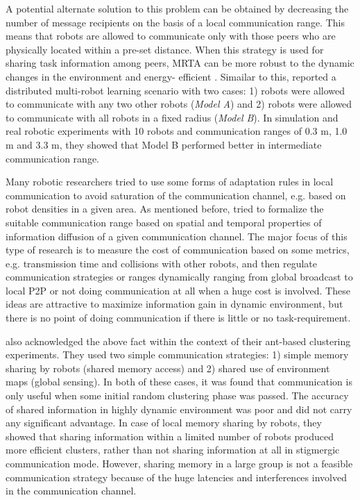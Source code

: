 \documentclass{intech}
\begin{document}
A potential alternate solution to this problem can be obtained by decreasing the number of message recipients on the basis of a local communication range. This means that robots are allowed to communicate only with those peers who are physically located within a pre-set distance. When this strategy is used for sharing task information among peers, MRTA can be more robust to the dynamic changes in the environment and energy- efficient \citep{Agassounon+2002}. Simailar to this, \cite{Pugh+2009} reported a distributed multi-robot learning scenario with two cases: 1) robots were allowed to communicate with any two other robots ({\em Model A}) and 2)  robots were allowed to communicate with all robots in a fixed radius ({\em Model B}). In simulation and real robotic experiments with 10 robots and communication ranges of 0.3 m, 1.0 m and 3.3 m, they showed that Model B performed better in intermediate communication range. 

Many robotic researchers tried to use some forms of adaptation rules in local communication to avoid saturation of the communication channel, e.g. based on robot densities in a given area.  As mentioned before,  \cite{Yoshida+2000} tried to formalize the suitable communication range based on spatial and temporal properties of information diffusion of a given communication channel. The major focus of this type of research is to measure the cost of communication based on some metrics, e.g.  transmission time and collisions with other robots, and then regulate communication strategies or ranges dynamically ranging from global broadcast to local P2P or not doing communication at all when a huge cost is involved. These ideas are attractive to maximize information gain in dynamic environment, but there is no point of doing communication if there is little or no task-requirement. 

\cite{Oca+2005} also acknowledged the above fact within the context of their ant-based clustering experiments. They used two simple communication strategies: 1) simple memory sharing by robots (shared memory access) and 2) shared use of environment maps (global sensing). In both of these cases, it was found that communication is only useful when some initial random clustering phase was passed. The accuracy of shared information in highly dynamic environment was poor and did not carry any significant advantage. In case of local memory sharing by robots, they showed that  sharing information within a limited number of robots produced more efficient  clusters, rather than  not sharing information at all in stigmergic communication mode. However, sharing memory in a large group is not a feasible communication strategy because of the huge latencies and interferences involved in the communication channel.
\end{document}
